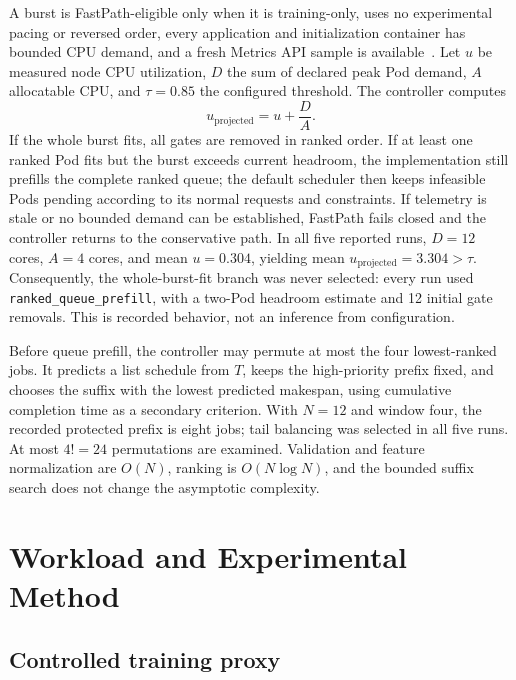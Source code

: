 \documentclass[10pt,journal,compsoc]{IEEEtran}
\begin{document}
A burst is FastPath-eligible only when it is training-only, uses no experimental pacing or reversed order, every application and initialization container has bounded CPU demand, and a fresh Metrics API sample is available~\cite{kubernetesMetrics}. Let $u$ be measured node CPU utilization, $D$ the sum of declared peak Pod demand, $A$ allocatable CPU, and $\tau=0.85$ the configured threshold. The controller computes
\begin{equation}
u_{\mathrm{projected}}=u+\frac{D}{A}.
\label{eq:headroom}
\end{equation}
If the whole burst fits, all gates are removed in ranked order. If at least one ranked Pod fits but the burst exceeds current headroom, the implementation still prefills the complete ranked queue; the default scheduler then keeps infeasible Pods pending according to its normal requests and constraints. If telemetry is stale or no bounded demand can be established, FastPath fails closed and the controller returns to the conservative path. In all five reported runs, $D=12$ cores, $A=4$ cores, and mean $u=0.304$, yielding mean $u_{\mathrm{projected}}=3.304>\tau$. Consequently, the whole-burst-fit branch was never selected: every run used \texttt{ranked\_queue\_prefill}, with a two-Pod headroom estimate and 12 initial gate removals. This is recorded behavior, not an inference from configuration.

Before queue prefill, the controller may permute at most the four lowest-ranked jobs. It predicts a list schedule from $T$, keeps the high-priority prefix fixed, and chooses the suffix with the lowest predicted makespan, using cumulative completion time as a secondary criterion. With $N=12$ and window four, the recorded protected prefix is eight jobs; tail balancing was selected in all five runs. At most $4! = 24$ permutations are examined. Validation and feature normalization are $O(N)$, ranking is $O(N\log N)$, and the bounded suffix search does not change the asymptotic complexity.

\section{Workload and Experimental Method}

\subsection{Controlled training proxy}
\end{document}
